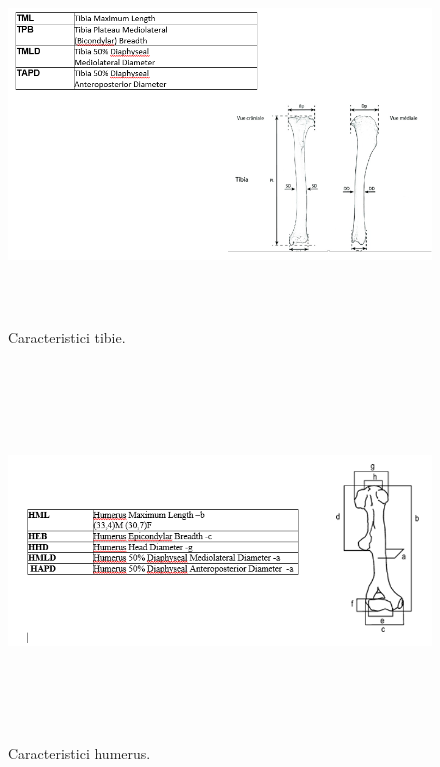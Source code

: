 \documentclass[runningheads,a4paper,11pt]{report}
\begin{document}
\begin{figure}[h!]
\centerline{\includegraphics[height=10cm]{Imagini/tibia.PNG}}
\caption{Caracteristici tibie.}
\label{fig}
\end{figure}

\begin{figure}[h!]
\centerline{\includegraphics[height=10cm]{Imagini/humerus.PNG}}
\caption{Caracteristici humerus.}
\label{fig}
\end{figure}
\end{document}
